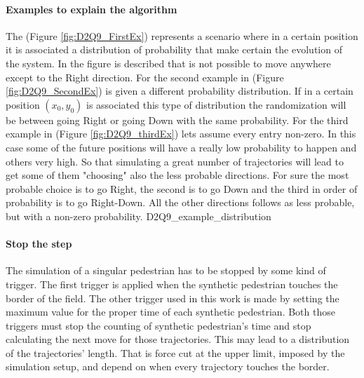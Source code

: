 \documentclass[class=article, crop=false]{standalone}
\begin{document}
\newpage
\paragraph{Examples to explain the algorithm}
The (Figure \ref{fig:D2Q9_FirstEx}) represents a scenario where in a certain position it is associated a distribution of probability that make certain the evolution of the system.
In the figure is described that is not possible to move anywhere except to the Right direction.
For the second example in (Figure \ref{fig:D2Q9_SecondEx}) is given a different probability distribution.
If in a certain position $(x_0, y_0)$ is associated this type of distribution the randomization will be between going Right or going Down with the same probability.
For the third example in (Figure \ref{fig:D2Q9_thirdEx}) lets assume every entry non-zero.
In this case some of the future positions will have a really low probability to happen and others very high.
So that simulating a great number of trajectories will lead to get some of them "choosing" also the less probable directions.
For sure the most probable choice is to go Right, the second is to go Down and the third in order of probability is to go Right-Down.
All the other directions follows as less probable, but with a non-zero probability.
	{D2Q9_example_distribution}

\paragraph{Stop the step}
The simulation of a singular pedestrian has to be stopped by some kind of trigger.
The first trigger is applied when the synthetic pedestrian touches the border of the field.
The other trigger used in this work is made by setting the maximum value for the proper time of each synthetic pedestrian.
Both those triggers must stop the counting of synthetic pedestrian's time and stop calculating the next move for those trajectories.
This may lead to a distribution of the trajectories' length.
That is force cut at the upper limit, imposed by the simulation setup, and depend on when every trajectory touches the border.


\FloatBarrier
\end{document}
